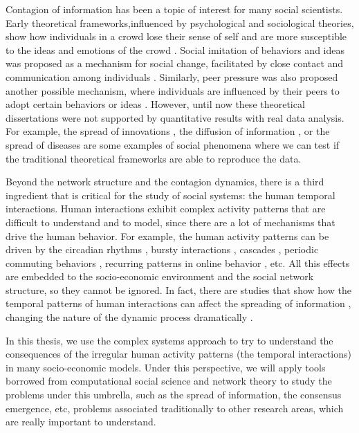 Contagion of information has been a topic of interest for many social scientists. Early theoretical frameworks,influenced by psychological and sociological theories, show how individuals in a crowd lose their sense of self and are more susceptible to the ideas and emotions of the crowd \cite{le2023crowd}. Social imitation of behaviors and ideas was proposed as a mechanism for social change, facilitated by close contact and communication among individuals \cite{kanter-1971}. Similarly, peer pressure was also proposed another possible mechanism, where individuals are influenced by their peers to adopt certain behaviors or ideas \cite{granovetter-1978, brown-1986}. However, until now these theoretical dissertations were not supported by quantitative results with real data analysis. For example, the spread of innovations \cite{rogers2014}, the diffusion of information \cite{valente-1996}, or the spread of diseases \cite{anderson1991infectious} are some examples of social phenomena where we can test if the traditional theoretical frameworks are able to reproduce the data.

Beyond the network structure and the contagion dynamics, there is a third ingredient that is critical for the study of social systems: the human temporal interactions. Human interactions exhibit complex activity patterns that are difficult to understand and to model, since there are a lot of mechanisms that drive the human behavior. For example, the human activity patterns can be driven by the circadian rhythms \cite{roenneberg-2013}, bursty interactions \cite{Barabasi2005Bursts}, cascades \cite{watts-2002}, periodic commuting behaviors \cite{gonzalez2008understanding}, recurring patterns in online behavior \cite{Lazer2009CompSocSci}, etc. All this effects are embedded to the socio-economic environment and the social network structure, so they cannot be ignored. In fact, there are studies that show how the temporal patterns of human interactions can affect the spreading of information \cite{Holme2012Temporal}, changing the nature of the dynamic process dramatically \cite{karsai-2011}.

In this thesis, we use the complex systems approach to try to understand the consequences of the irregular human activity patterns (the temporal interactions) in many socio-economic models. Under this perspective, we will apply tools borrowed from computational social science and network theory to study the problems under this umbrella, such as the spread of information, the consensus emergence, etc, problems associated traditionally to other research areas, which are really important to understand.


